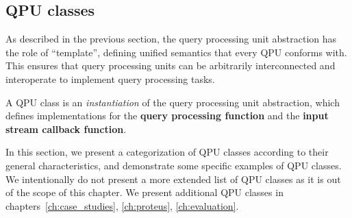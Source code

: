 







\subsection{QPU classes}
\label{sec:qpu_classes}

As described in the previous section, the query processing unit abstraction has the role of ``template'',
defining unified semantics that every QPU conforms with.
This ensures that query processing units can be arbitrarily interconnected and interoperate to implement query processing
tasks.

A QPU class is an \textit{instantiation} of the query processing unit abstraction, which defines implementations for
the \textbf{query processing function} and the \textbf{input stream callback function}.

In this section, we present a categorization of QPU classes according to their general characteristics,
and demonstrate some specific examples of QPU classes.
We intentionally do not present a more extended list of QPU classes as it is out of the scope of this chapter.
We present additional QPU classes in chapters~\ref{ch:case_studies}, \ref{ch:proteus}, \ref{ch:evaluation}.

